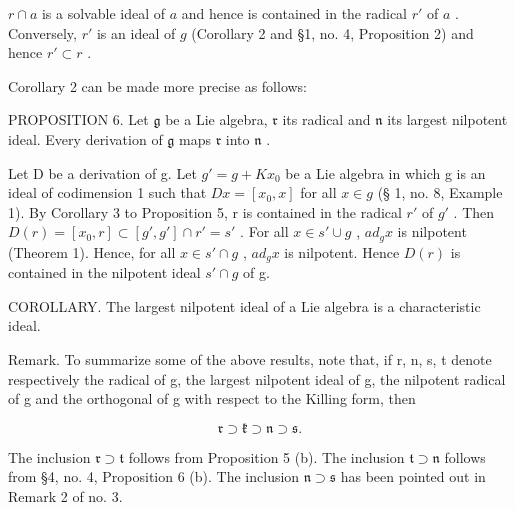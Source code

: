 \(r \cap a\) is a solvable ideal of \(a\) and hence is contained in the radical \(r'\) of \(a\) . Conversely, \(r'\) is an ideal of \(g\) (Corollary 2 and §1, no. 4, Proposition 2) and hence \(r' \subset r\) .

Corollary 2 can be made more precise as follows:

PROPOSITION 6. Let \(\mathfrak{g}\) be a Lie algebra, \(\mathfrak{r}\) its radical and \(\mathfrak{n}\) its largest nilpotent ideal. Every derivation of \(\mathfrak{g}\) maps \(\mathfrak{r}\) into \(\mathfrak{n}\) .

Let D be a derivation of g. Let \(g' = g + Kx_0\) be a Lie algebra in which g is an ideal of codimension 1 such that \(Dx = [x_0, x]\) for all \(x \in g\) (§ 1, no. 8, Example 1). By Corollary 3 to Proposition 5, r is contained in the radical \(r'\) of \(g'\) . Then \(D(r) = [x_0, r] \subset [g', g'] \cap r' = s'\) . For all \(x \in s' \cup g\) , \(ad_g x\) is nilpotent (Theorem 1). Hence, for all \(x \in s' \cap g\) , \(ad_g x\) is nilpotent. Hence \(D(r)\) is contained in the nilpotent ideal \(s' \cap g\) of g.

COROLLARY. The largest nilpotent ideal of a Lie algebra is a characteristic ideal.

Remark. To summarize some of the above results, note that, if r, n, s, t denote respectively the radical of g, the largest nilpotent ideal of g, the nilpotent radical of g and the orthogonal of g with respect to the Killing form, then

\[
\mathfrak {r} \supset \mathfrak {k} \supset \mathfrak {n} \supset \mathfrak {s}.
\]

The inclusion \(\mathfrak{r} \supset \mathfrak{t}\) follows from Proposition 5 (b). The inclusion \(\mathfrak{t} \supset \mathfrak{n}\) follows from §4, no. 4, Proposition 6 (b). The inclusion \(\mathfrak{n} \supset \mathfrak{s}\) has been pointed out in Remark 2 of no. 3.

